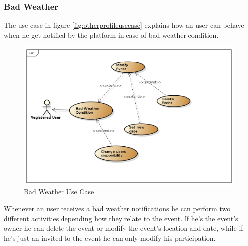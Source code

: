 \subsubsection{Bad Weather}
The use case in figure \ref{fig:otherprofileusecase} explains how an user can behave when he get notified by the platform in case of bad weather condition.
 \begin{center}
 \begin{figure}[H]
    \includegraphics[width=1.1\textwidth]{./UMLDiagram/use_case/BadWeather/BadWeather.png}
    \caption{Bad Weather Use Case}
     \label{fig:badweatherusecase}
     \end{figure}
   \end{center}  
Whenever an user receives a bad weather notifications he can perform two different activities depending how they relate to the event. If he's the event's owner he can delete the event or modify the event's location and date, while if he's just an invited to the event he can only modify his participation.
